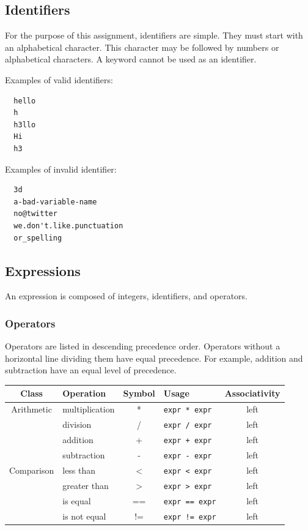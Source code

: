 \documentclass{article}
\begin{document}
\subsection{Identifiers}
For the purpose of this assignment, identifiers are simple. They must start with an alphabetical
character. This character may be followed by numbers or alphabetical characters. A keyword cannot
be used as an identifier.

Examples of valid identifiers:
\begin{lstlisting}
  hello
  h
  h3llo
  Hi
  h3
\end{lstlisting}

Examples of invalid identifier:
\begin{lstlisting}
  3d
  a-bad-variable-name
  no@twitter
  we.don't.like.punctuation
  or_spelling
\end{lstlisting}

\subsection{Expressions}
An expression is composed of integers, identifiers, and operators.

\subsubsection{Operators}
Operators are listed in descending precedence order. Operators without a horizontal line dividing
them have equal precedence. For example, addition and subtraction have an equal level of precedence.
\begin{center}
  \begin{tabular}{|c|l|c|l|c|}
    \hline
    \textbf{Class} & \textbf{Operation} & \textbf{Symbol} & \textbf{Usage} &
    \textbf{Associativity} \\
    \hline
    Arithmetic
    &multiplication & * & \texttt{expr * expr} & left \\
    &division       & / & \texttt{expr / expr} & left \\ \cline{2-5}
    &addition      & + & \texttt{expr + expr} & left \\
    &subtraction    & - & \texttt{expr - expr} & left \\
    \hline
    Comparison
    &less than      & <  & \texttt{expr < expr}  & left \\
    &greater than   & >  & \texttt{expr > expr}  & left \\ \cline{2-5}
    &is equal       & == & \texttt{expr == expr} & left \\
    &is not equal   & != & \texttt{expr != expr} & left \\
    \hline
  \end{tabular}
\end{center}
\end{document}
